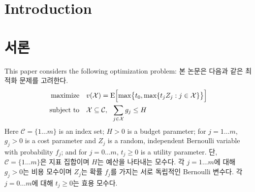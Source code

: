 \documentclass[11pt]{article} %
\theoremstyle{definition}
\newtheorem{definition}{Definition}
\theoremstyle{definition}
\newtheorem{definition}{정의}
\begin{document}
\pagebreak

\tableofcontents



\pagebreak
\ifen \section{Introduction}  \else \section{서론} \fi
\ifen This paper considers the following optimization problem:
\else 본 논문은 다음과 같은 최적화 문제를 고려한다.\fi
\begin{align} \label{headlineproblem}
\begin{split}
\text{maximize}\quad & v(\mathcal{X}) =  \operatorname{E}\Bigl[\max\bigr\{t_0,
\max\{t_j Z_j : j \in \mathcal{X}\}\bigr\}\Bigr] \\
\text{subject to}\quad & \mathcal{X} \subseteq \mathcal{C}, ~~\sum_{j\in \mathcal{X}} g_j \leq H
\end{split}
\end{align}
\ifen Here $\mathcal{C} = \{ 1 \dots m\}$ is an index set; $H > 0$ is a budget parameter; for $j = 1 \dots m$, $g_j > 0$ is a cost parameter and $Z_j$ is a random, independent Bernoulli variable with probability $f_j$; and for $j = 0\dots m$, $t_j\geq 0$ is a utility parameter. 
\else 단,  $\mathcal{C} = \{ 1 \dots m\}$은 지표 집합이며 $H$는 예산을 나타내는 모수다. 각 $j = 1 \dots m$에 대해 $g_j > 0$는 비용 모수이며 $Z_j$는 확률 $f_j$를 가지는 서로 독립적인 Bernoulli 변수다. 각 $j = 0 \dots m$에 대해 $t_j\geq 0$는 효용 모수다. \fi
\end{document}
